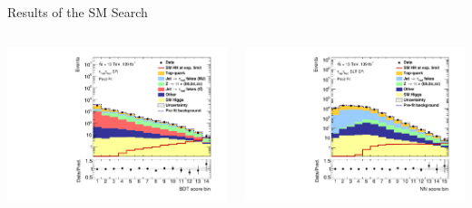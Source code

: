 \documentclass[11pt, xcolor={dvipsnames}, aspectratio=169, notes]{beamer}
\begin{document}
\begin{frame}{Results of the SM \allbold{\HH} Search}
  \vspace*{0.5em}
  \begin{columns}
    \centering


    \includegraphics[width=\textwidth, trim=0.5em 0 2.5em 0, clip]{results_nonres/postfit/Region_BMin0_incJet1_distSMBDT_J2_Y2015_DLLOS_T2_SpcTauHH_L0_GlobalFit_conditionnal_mu0log}

    \centering


    \includegraphics[width=\textwidth, trim=0.5em 0 2.5em 0, clip]{results_nonres/postfit/Region_BMin0_incJet1_distNN_J2_DSM_T2_SpcTauLH_Y2015_LTT0_L1_GlobalFit_conditionnal_mu0log}


\end{columns}
\end{frame}
\end{document}
